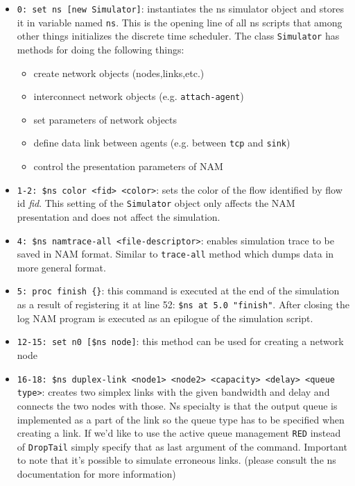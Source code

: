 \documentclass[a4paper]{article}
\begin{document}
\begin{itemize}

    \item \verb!0: set ns [new Simulator]!: instantiates the ns simulator object and stores it in variable named
          \verb!ns!. This is the opening line of all ns scripts that among other things initializes the
          discrete
          time scheduler. The class \verb!Simulator! has methods for doing the following things:

          \begin{itemize}
              \item create network objects (nodes,links,etc.)
              \item interconnect network objects (e.g. \verb!attach-agent!)
              \item set parameters of network objects
              \item define data link between agents (e.g. between \verb!tcp! and \verb!sink!)
              \item control the presentation parameters of NAM
          \end{itemize}

    \item \verb!1-2: $ns color <fid> <color>!: sets the color of the flow identified by flow id \emph{fid}. This setting of the
          \verb!Simulator! object only affects the NAM presentation and does not affect the simulation.

    \item \verb!4: $ns namtrace-all <file-descriptor>!: enables simulation trace to be saved in NAM format. Similar to
          \verb!trace-all!
          method which dumps data in more general format.

    \item \verb!5: proc finish {}!: this command is executed at the end of the simulation as a result of registering it
          at
          line 52: \verb!$ns at 5.0 "finish"!. After closing the log NAM program is executed as an epilogue of the
          simulation
          script.

    \item \verb!12-15: set n0 [$ns node]!: this method can be used for creating a network node

    \item \verb!16-18: $ns duplex-link <node1> <node2> <capacity> <delay> <queue type>!: creates two simplex links with the given bandwidth and delay and connects the two
          nodes
          with those. Ns specialty is that the output queue is implemented as a part of the link so the queue type has
          to be
          specified when creating a link. If we'd like to use the active queue management \verb!RED!
          instead of
          \verb!DropTail! simply specify that as last argument of the command. Important to note that it's
          possible to
          simulate erroneous links. (please consult the ns documentation for more information)


\end{itemize}
\end{document}
